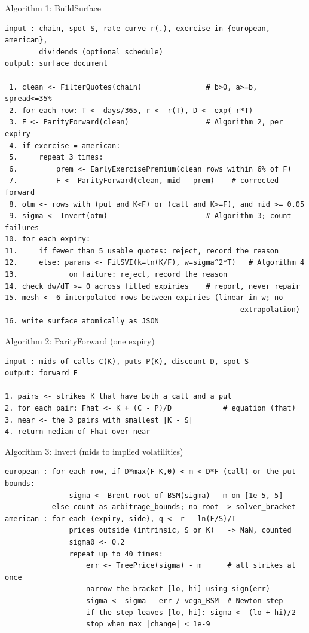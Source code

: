 \documentclass[11pt]{article}
\begin{document}
\begin{algobox}{Algorithm 1: BuildSurface}
\begin{verbatim}
input : chain, spot S, rate curve r(.), exercise in {european, american},
        dividends (optional schedule)
output: surface document

 1. clean <- FilterQuotes(chain)               # b>0, a>=b, spread<=35%
 2. for each row: T <- days/365, r <- r(T), D <- exp(-r*T)
 3. F <- ParityForward(clean)                  # Algorithm 2, per expiry
 4. if exercise = american:
 5.     repeat 3 times:
 6.         prem <- EarlyExercisePremium(clean rows within 6% of F)
 7.         F <- ParityForward(clean, mid - prem)    # corrected forward
 8. otm <- rows with (put and K<F) or (call and K>=F), and mid >= 0.05
 9. sigma <- Invert(otm)                       # Algorithm 3; count failures
10. for each expiry:
11.     if fewer than 5 usable quotes: reject, record the reason
12.     else: params <- FitSVI(k=ln(K/F), w=sigma^2*T)   # Algorithm 4
13.            on failure: reject, record the reason
14. check dw/dT >= 0 across fitted expiries    # report, never repair
15. mesh <- 6 interpolated rows between expiries (linear in w; no
                                                       extrapolation)
16. write surface atomically as JSON
\end{verbatim}
\end{algobox}

\begin{algobox}{Algorithm 2: ParityForward (one expiry)}
\begin{verbatim}
input : mids of calls C(K), puts P(K), discount D, spot S
output: forward F

1. pairs <- strikes K that have both a call and a put
2. for each pair: Fhat <- K + (C - P)/D            # equation (fhat)
3. near <- the 3 pairs with smallest |K - S|
4. return median of Fhat over near
\end{verbatim}
\end{algobox}

\begin{algobox}{Algorithm 3: Invert (mids to implied volatilities)}
\begin{verbatim}
european : for each row, if D*max(F-K,0) < m < D*F (call) or the put bounds:
               sigma <- Brent root of BSM(sigma) - m on [1e-5, 5]
           else count as arbitrage_bounds; no root -> solver_bracket
american : for each (expiry, side), q <- r - ln(F/S)/T
               prices outside (intrinsic, S or K)   -> NaN, counted
               sigma0 <- 0.2
               repeat up to 40 times:
                   err <- TreePrice(sigma) - m      # all strikes at once
                   narrow the bracket [lo, hi] using sign(err)
                   sigma <- sigma - err / vega_BSM  # Newton step
                   if the step leaves [lo, hi]: sigma <- (lo + hi)/2
                   stop when max |change| < 1e-9
\end{verbatim}
\end{algobox}
\end{document}
